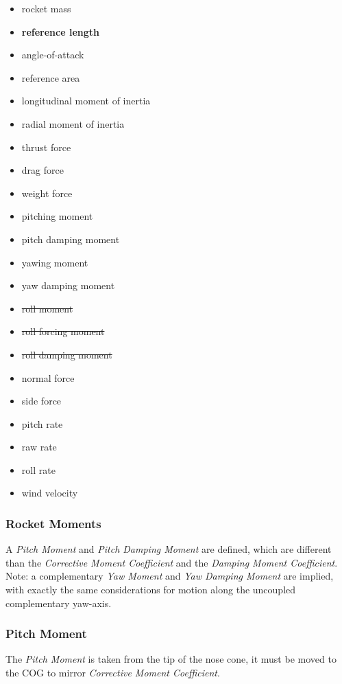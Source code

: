 \documentclass[]{article}
\providecommand{\tightlist}{%
  \setlength{\itemsep}{0pt}\setlength{\parskip}{0pt}}
\begin{document}
\begin{itemize}
\tightlist
\item
  rocket mass
\item
  \textbf{reference length}
\item
  angle-of-attack
\item
  reference area
\item
  longitudinal moment of inertia
\item
  radial moment of inertia
\item
  thrust force
\item
  drag force
\item
  weight force
\item
  pitching moment
\item
  pitch damping moment
\item
  yawing moment
\item
  yaw damping moment
\item
  \sout{roll moment}
\item
  \sout{roll forcing moment}
\item
  \sout{roll damping moment}
\item
  normal force
\item
  side force
\item
  pitch rate
\item
  raw rate
\item
  roll rate
\item
  wind velocity
\end{itemize}

\subsubsection{Rocket Moments}\label{rocket-moments}

A \emph{Pitch Moment} and \emph{Pitch Damping Moment} are defined, which
are different than the \emph{Corrective Moment Coefficient} and the
\emph{Damping Moment Coefficient}. Note: a complementary \emph{Yaw
Moment} and \emph{Yaw Damping Moment} are implied, with exactly the same
considerations for motion along the uncoupled complementary yaw-axis.

\subsubsection{Pitch Moment}\label{pitch-moment}

The \emph{Pitch Moment} is taken from the tip of the nose cone, it must
be moved to the COG to mirror \emph{Corrective Moment Coefficient}.
\end{document}
